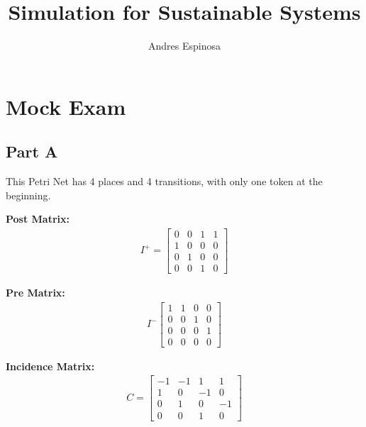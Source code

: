 \documentclass[11pt]{article}
\title{Simulation for Sustainable Systems}
\author{Andres Espinosa}
\begin{document}
\pgfplotsset{compat=1.18}
\maketitle

\tableofcontents
\section{Mock Exam}
\subsection{Part A}
This Petri Net has 4 places and 4 transitions, with only one token at the beginning.

\textbf{Post Matrix: }
\begin{align}
    I^{+} =
  \begin{bmatrix}
     0 & 0 & 1 & 1 \\
     1 & 0 & 0 & 0 \\
     0 & 1 & 0 & 0 \\
     0 & 0 & 1 & 0 
  \end{bmatrix}
\end{align}

\textbf{Pre Matrix: }
\begin{align}
    I^{-}
  \begin{bmatrix}
     1 & 1 & 0 & 0 \\
     0 & 0 & 1 & 0 \\
     0 & 0 & 0 & 1 \\
     0 & 0 & 0 & 0 
  \end{bmatrix}
\end{align}

\textbf{Incidence Matrix: }
\begin{align}
    C = 
  \begin{bmatrix}
     -1 & -1 & 1 & 1 \\
     1 & 0 & -1 & 0 \\
     0 & 1 & 0 & -1 \\
     0 & 0 & 1 & 0 
  \end{bmatrix}
\end{align}
\end{document}
